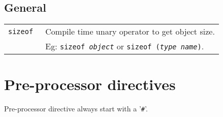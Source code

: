 \begin{multicols*}{3}
\subsection{General}
\begin{tabularx}{\linewidth}{lX}
\texttt{sizeof } & Compile time unary operator to get object size.\\
& Eg: \texttt{sizeof \textit{object}} or \texttt{sizeof (\textit{type name})}.\\
\end{tabularx}

\vfill \null
\columnbreak


\section{Pre-processor directives}
Pre-processor directive always start with a '\texttt{\#}'.\\


\end{multicols*}
